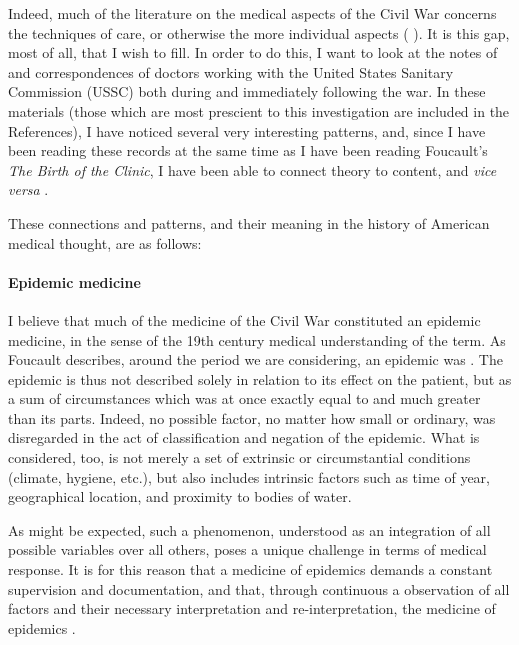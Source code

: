 \documentclass{report}
\begin{document}
  Indeed, much of the literature on the medical aspects of the Civil War concerns the techniques of care, or otherwise the more individual aspects 
  (\citeauthor{Devine2016} ). It is this gap, most of all, that I wish to fill. In order to do this, I want to look at the notes of and
  correspondences of doctors working with the United States Sanitary Commission (USSC) both during and immediately following the war. In these materials 
  (those which are most prescient to this investigation are included in the References), I have noticed several very interesting patterns, and, since I have
  been reading these records at the same time as I have been reading Foucault's \textit{The Birth of the Clinic}, I have been able to connect theory to
  content, and \textit{vice versa} \autocite{Foucault1994}.

  These connections and patterns, and their meaning in the history of American medical thought, are as follows:
  \paragraph{Epidemic medicine}\label{par:epidemic_medicine} %
  I believe that much of the medicine of the Civil War constituted an epidemic medicine, in the sense of the 19th century medical understanding of the term.
  As Foucault describes, around the period we are considering, an epidemic was  \autocite[pp. 23]{Foucault1994}. The epidemic is thus not described solely in relation to its
  effect on the patient, but as a sum of circumstances which was at once exactly equal to and much greater than its parts. Indeed, no possible factor,
  no matter how small or ordinary, was disregarded in the act of classification and negation of the epidemic. What is considered, too, is not merely a set
  of extrinsic or circumstantial conditions (climate, hygiene, etc.), but also includes intrinsic factors such as time of year, geographical location,
  and proximity to bodies of water. 

  As might be expected, such a phenomenon, understood as an integration of all possible variables over all others, poses a unique challenge in terms of medical
  response. It is for this reason that a medicine of epidemics demands a constant supervision and documentation, and that, through continuous a observation
  of all factors and their necessary interpretation and re-interpretation, the medicine of epidemics  \autocite[pp. 25]{Foucault1994}.

  \newpage
  \nocite{*}
  \printbibliography
\end{document}
